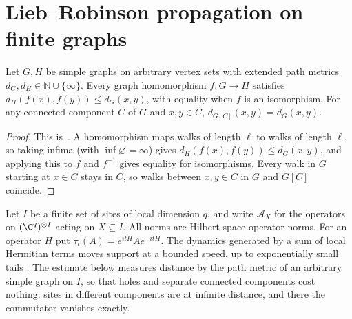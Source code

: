 
\section{Lieb--Robinson propagation on finite graphs}
\label{sec:qc_lieb_robinson}

\begin{lemma}
    \label{thm:qc_graph_edist_transport}
    \leanok
    Let $G,H$ be simple graphs on arbitrary vertex sets with extended path metrics $d_G,d_H\in\mathbb N\cup\{\infty\}$. Every graph homomorphism $f\colon G\to H$ satisfies $d_H(f(x),f(y))\le d_G(x,y)$, with equality when $f$ is an isomorphism. For any connected component $C$ of $G$ and $x,y\in C$, $d_{G[C]}(x,y)=d_G(x,y)$.
\end{lemma}
\begin{proof}
    \leanok
    This is~\cite[``Extended distance under graph maps'']{QICLean2026Blueprint}.
    A homomorphism maps walks of length $\ell$ to walks of length $\ell$, so taking infima (with $\inf\varnothing=\infty$) gives $d_H(f(x),f(y))\le d_G(x,y)$, and applying this to $f$ and $f^{-1}$ gives equality for isomorphisms. Every walk in $G$ starting at $x\in C$ stays in $C$, so walks between $x,y\in C$ in $G$ and $G[C]$ coincide.
\end{proof}

Let $I$ be a finite set of sites of local dimension $q$, and write
$\mathcal A_X$ for the operators on $(\C^q)^{\otimes I}$ acting on
$X\subseteq I$. All norms are Hilbert-space operator norms. For an operator
$H$ put $\tau_t(A)=e^{itH}Ae^{-itH}$. The dynamics generated by a sum of
local Hermitian terms moves support at a bounded speed, up to exponentially
small tails \cite{Hastings2006Spectral,Nachtergaele2006LiebRobinson}. The
estimate below measures distance by the path metric of an arbitrary simple
graph on $I$, so that holes and separate connected components cost nothing:
sites in different components are at infinite distance, and there the
commutator vanishes exactly.

